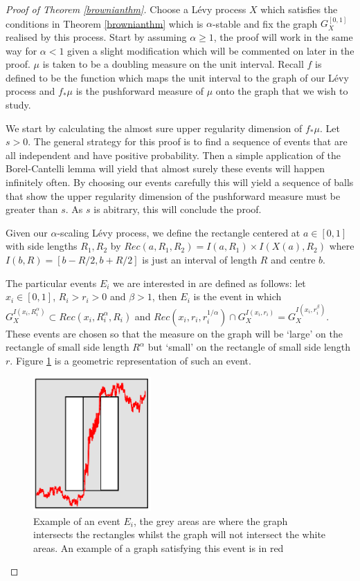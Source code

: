 \begin{proof}[Proof of Theorem \ref{brownianthm}]



Choose a L\'evy process $X$ which satisfies the conditions in Theorem \ref{brownianthm} which is $\alpha$-stable and fix the graph $G_X^{[0,1]}$ realised by this process. Start by assuming $\alpha \ge 1$, the proof will work in the same way for $\alpha < 1$ given a slight modification which will be commented on later in the proof. $\mu$ is taken to be a doubling measure on the unit interval. Recall $f$ is defined to be the function which maps the unit interval to the graph of our L\'evy process and $f_*\mu$ is the pushforward measure of $\mu$ onto the graph that we wish to study.

We start by calculating the almost sure upper regularity dimension of $f_*\mu$. Let $s>0$. The general strategy for this proof is to find a sequence of events that are all independent and have positive probability. Then a simple application of the Borel-Cantelli lemma will yield that almost surely these events will happen infinitely often. By choosing our events carefully this will yield a sequence of balls that show the upper regularity dimension of the pushforward measure must be greater than $s$. As $s$ is abitrary, this will conclude the proof.

Given our $\alpha$-scaling L\'evy process, we define the rectangle centered at $a\in [0,1]$ with side lengths $R_1,R_2$ by $Rec(a,R_1,R_2) = I(a,R_1) \times I(X(a),R_2)$ where $I(b,R) = [b-R/2,b+R/2]$ is just an interval of length $R$ and centre $b$. 

The particular events $E_i$ we are interested in are defined as follows: let $x_i \in [0,1]$, $R_i > r_i> 0$ and $\beta > 1$, then $E_i$ is the event in which $G_X^{I(x_i,R_i^{\alpha})} \subset Rec(x_i,R_i^{\alpha},R_i)$ and $Rec(x_i, r_i, r_i^{1/\alpha}) \cap G_X^{I(x_i,r_i)} = G_X^{I(x_i,r_i^{\beta})}$. These events are chosen so that the measure on the graph will be `large' on the rectangle of small side length $R^{\alpha}$ but `small' on the rectangle of small side length $r$. Figure \ref{brownian_event} is a geometric representation of such an event.  

\begin{figure}[htbp]
	\centering
	\includegraphics[width=0.4\textwidth]{pics/ch-brownian/new_rectangles.png}
	\caption{Example of an event $E_i$, the grey areas are where the graph intersects the rectangles whilst the graph will not intersect the white areas. An example of a graph satisfying this event is in red}
	\label{brownian_event}
\end{figure}


\end{proof}
